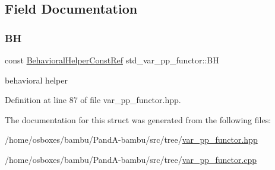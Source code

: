 \subsection{Field Documentation}
\mbox{\label{structstd__var__pp__functor_a87e28abced1e150ba628419c23e14860}} 
\subsubsection{\texorpdfstring{BH}{BH}}
{\footnotesize\ttfamily const \hyperlink{behavioral__helper_8hpp_aae973b54cac87eef3b27442aa3e1e425}{Behavioral\+Helper\+Const\+Ref} std\+\_\+var\+\_\+pp\+\_\+functor\+::\+BH\hspace{0.3cm}{\ttfamily [private]}}



behavioral helper 



Definition at line 87 of file var\+\_\+pp\+\_\+functor.\+hpp.



The documentation for this struct was generated from the following files\+:\begin{DoxyCompactItemize}
\item 
/home/osboxes/bambu/\+Pand\+A-\/bambu/src/tree/\hyperlink{var__pp__functor_8hpp}{var\+\_\+pp\+\_\+functor.\+hpp}\item 
/home/osboxes/bambu/\+Pand\+A-\/bambu/src/tree/\hyperlink{var__pp__functor_8cpp}{var\+\_\+pp\+\_\+functor.\+cpp}\end{DoxyCompactItemize}
